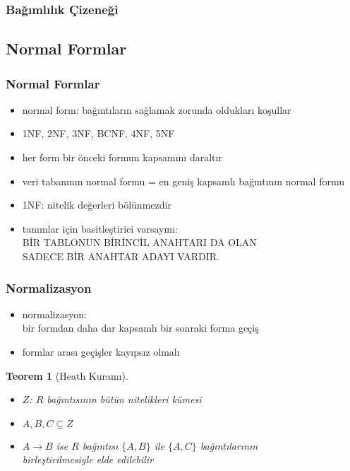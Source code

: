 \documentclass[dvipsnames]{beamer}
\theoremstyle{theorem}
\newtheorem{teorem}[theorem]{Teorem}
\begin{document}
\begin{frame}
  \frametitle{Bağımlılık Çizeneği}

  \begin{center}
  \end{center}
\end{frame}

\subsection{Normal Formlar}

\begin{frame}
  \frametitle{Normal Formlar}

  \begin{itemize}
    \item normal form: bağıntıların sağlamak zorunda oldukları koşullar 
    
    \medskip
    \item 1NF, 2NF, 3NF, BCNF, 4NF, 5NF
    \item her form bir önceki formun kapsamını daraltır
    \item veri tabanının normal formu = en geniş kapsamlı bağıntının normal formu 
    
    \pause
    \medskip
    \item 1NF: nitelik değerleri bölünmezdir
    
    \pause
    \medskip
    \item tanımlar için basitleştirici varsayım:\\
      \alert{BİR TABLONUN BİRİNCİL ANAHTARI DA OLAN\\
          SADECE BİR ANAHTAR ADAYI VARDIR.}
  \end{itemize}
\end{frame}

\begin{frame}
  \frametitle{Normalizasyon}

  \begin{itemize}
    \item \alert{normalizasyon}:\\
      bir formdan daha dar kapsamlı bir sonraki forma geçiş

      \item formlar arası geçişler kayıpsız olmalı
    \end{itemize}

  \pause
  \begin{teorem}[Heath Kuramı]
    \begin{itemize}
      \item $Z$: $R$ bağıntısının bütün nitelikleri kümesi
      \item $A,B,C \subseteq Z$

      \medskip
      \item $A \rightarrow B$ ise $R$ bağıntısı $\{A,B\}$ ile $\{A,C\}$
        bağıntılarının\\
        birleştirilmesiyle elde edilebilir
    \end{itemize}
  \end{teorem}
\end{frame}
\end{document}
